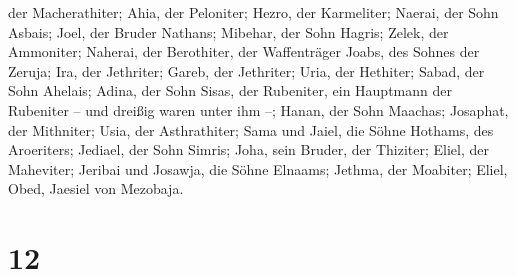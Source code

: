 der Macherathiter; Ahia, der Peloniter;  Hezro, der
Karmeliter; Naerai, der Sohn Asbais;  Joel, der Bruder
Nathans; Mibehar, der Sohn Hagris;  Zelek, der Ammoniter;
Naherai, der Berothiter, der Waffenträger Joabs, des Sohnes der Zeruja;
 Ira, der Jethriter; Gareb, der Jethriter;
 Uria, der Hethiter; Sabad, der Sohn Ahelais;
 Adina, der Sohn Sisas, der Rubeniter, ein Hauptmann der
Rubeniter -- und dreißig waren unter ihm --;  Hanan, der
Sohn Maachas; Josaphat, der Mithniter;  Usia, der
Asthrathiter; Sama und Jaiel, die Söhne Hothams, des Aroeriters;
 Jediael, der Sohn Simris; Joha, sein Bruder, der
Thiziter;  Eliel, der Maheviter; Jeribai und Josawja, die
Söhne Elnaams; Jethma, der Moabiter;  Eliel, Obed,
Jaesiel von Mezobaja.

\hypertarget{section-11}{%
\section{12}\label{section-11}}

